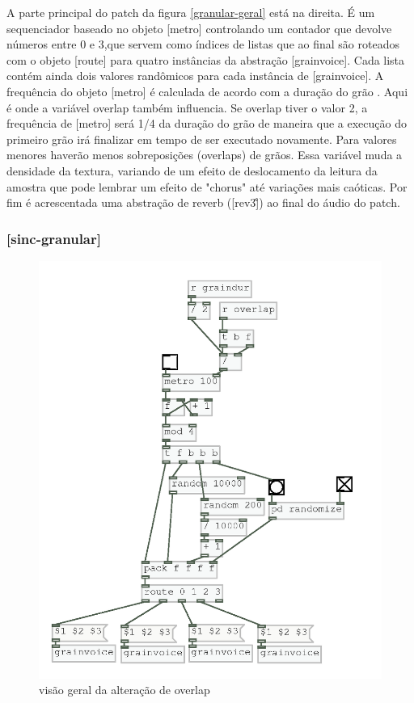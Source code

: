 \documentclass{ppgmus}
\begin{document}
A parte principal do patch da figura \ref{granular-geral} está na direita. É um sequenciador baseado no objeto
[metro] controlando um contador que devolve números entre 0 e 3,que servem como índices de listas que ao final
são roteados com o objeto [route] para quatro instâncias da abstração [grainvoice]. Cada lista contém ainda dois
valores randômicos para cada instância de [grainvoice]. A frequência do objeto [metro] é calculada de acordo com a duração
do grão . Aqui é onde a variável
overlap também influencia. Se overlap tiver o valor 2, a frequência de [metro] será 1/4 da duração
do grão de maneira que a execução do primeiro grão irá finalizar em tempo de ser executado novamente.
Para valores menores haverão menos sobreposições (overlaps) de grãos. Essa variável muda a densidade da
textura, variando de um efeito de deslocamento da leitura da amostra que pode lembrar um efeito de 
"chorus" até variações mais caóticas. Por fim é acrescentada uma abstração de reverb ([rev3\~]) ao final
do áudio do patch.



\subsubsection{[sinc-granular]}




\begin{figure}[-h]
\includegraphics[scale=.6]{sinc-gran1}
\caption{visão geral da alteração de overlap}
\label{sinc-gran1}
\end{figure}
\end{document}
